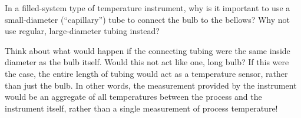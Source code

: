 

In a filled-system type of temperature instrument, why is it important to use a small-diameter (``capillary'') tube to connect the bulb to the bellows?  Why not use regular, large-diameter tubing instead?







Think about what would happen if the connecting tubing were the same inside diameter as the bulb itself.  Would this not act like one, long bulb?  If this were the case, the entire length of tubing would act as a temperature sensor, rather than just the bulb.  In other words, the measurement provided by the instrument would be an aggregate of all temperatures between the process and the instrument itself, rather than a single measurement of process temperature!











